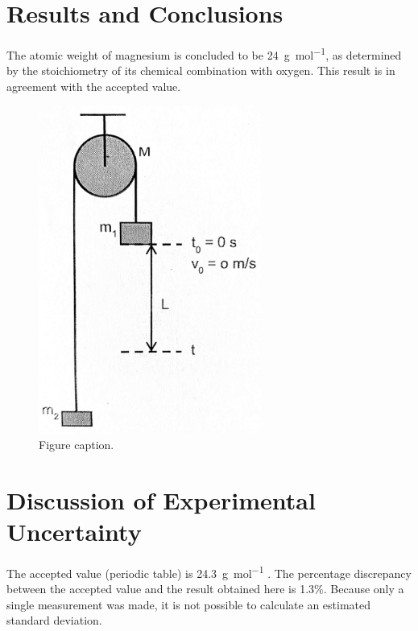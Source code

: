 \documentclass{article}
\begin{document}
\section{Results and Conclusions}

The atomic weight of magnesium is concluded to be \SI{24}{\gram\per\mol}, as determined by the stoichiometry of its chemical combination with oxygen. This result is in agreement with the accepted value.

\begin{figure}[h]
    \begin{center}
        \includegraphics[width=0.65\textwidth]{okay.jpg} 
        \caption{Figure caption.}
    \end{center}
\end{figure}


\section{Discussion of Experimental Uncertainty}

The accepted value (periodic table) is \SI{24.3}{\gram\per\mole} \cite{Smith:2012qr}. The percentage discrepancy between the accepted value and the result obtained here is 1.3\%. Because only a single measurement was made, it is not possible to calculate an estimated standard deviation.
\end{document}
